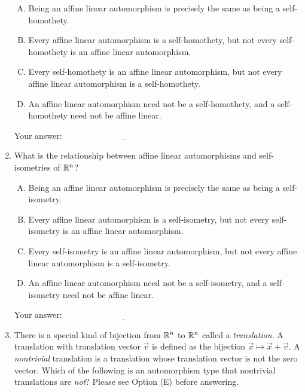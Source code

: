 \documentclass[10pt]{amsart}
\begin{document}
\begin{enumerate}
  \begin{enumerate}[(A)]
  \item Being an affine linear automorphism is precisely the same as
    being a self-homothety.
  \item Every affine linear automorphism is a self-homothety, but not
    every self-homothety is an affine linear automorphism.
  \item Every self-homothety is an affine linear automorphism, but not
    every affine linear automorphism is a self-homothety.
  \item An affine linear automorphism need not be a self-homothety,
    and a self-homothety need not be affine linear.
  \end{enumerate}

  \vspace{0.1in}
  Your answer: $\underline{\qquad\qquad\qquad\qquad\qquad\qquad\qquad}$
  \vspace{0.1in}

\item What is the relationship between affine linear automorphisms and
  self-isometries of $\mathbb{R}^n$?

  \begin{enumerate}[(A)]
  \item Being an affine linear automorphism is precisely the same as
    being a self-isometry.
  \item Every affine linear automorphism is a self-isometry, but not
    every self-isometry is an affine linear automorphism.
  \item Every self-isometry is an affine linear automorphism, but not
    every affine linear automorphism is a self-isometry.
  \item An affine linear automorphism need not be a self-isometry, and
    a self-isometry need not be affine linear.
  \end{enumerate}

  \vspace{0.1in}
  Your answer: $\underline{\qquad\qquad\qquad\qquad\qquad\qquad\qquad}$
  \vspace{0.1in}

\item There is a special kind of bijection from $\mathbb{R}^n$ to $\mathbb{R}^n$
  called a {\em translation}. A translation with translation vector
  $\vec{v}$ is defined as the bijection $\vec{x} \mapsto \vec{x} +
  \vec{v}$. A {\em nontrivial} translation is a translation whose
  translation vector is not the zero vector. Which of the following is
  an automorphism type that nontrivial translations are {\em not}?
  Please see Option (E) before answering.


\end{enumerate}
\end{document}
